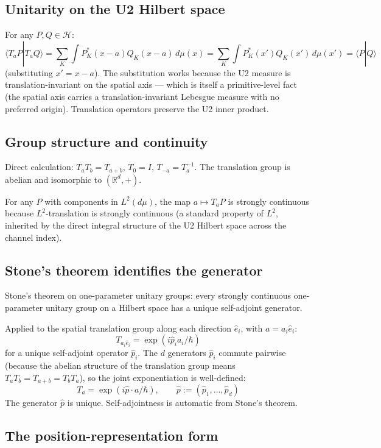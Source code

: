 \documentclass[11pt,a4paper]{article}
\begin{document}
\subsection{Unitarity on the U2 Hilbert space}

For any $P, Q \in \mathcal{H}$:
\[
\langle T_a P | T_a Q\rangle = \sum_K \int P^*_K(x - a) Q_K(x - a) \, d\mu(x) = \sum_K \int P^*_K(x') Q_K(x') \, d\mu(x') = \langle P | Q\rangle
\]
(substituting $x' = x - a$). The substitution works because the U2 measure is translation-invariant on the spatial axis --- which is itself a primitive-level fact (the spatial axis carries a translation-invariant Lebesgue measure with no preferred origin). Translation operators preserve the U2 inner product.

\subsection{Group structure and continuity}

Direct calculation: $T_a T_b = T_{a+b}$, $T_0 = I$, $T_{-a} = T_a^{-1}$. The translation group is abelian and isomorphic to $(\mathbb{R}^d, +)$.

For any $P$ with components in $L^2(d\mu)$, the map $a \mapsto T_a P$ is strongly continuous because $L^2$-translation is strongly continuous (a standard property of $L^2$, inherited by the direct integral structure of the U2 Hilbert space across the channel index).

\subsection{Stone's theorem identifies the generator}

Stone's theorem on one-parameter unitary groups: every strongly continuous one-parameter unitary group on a Hilbert space has a unique self-adjoint generator.

Applied to the spatial translation group along each direction $\hat{e}_i$, with $a = a_i \hat{e}_i$:
\[
T_{a_i \hat{e}_i} = \exp(i \hat{p}_i a_i / \hbar)
\]
for a unique self-adjoint operator $\hat{p}_i$. The $d$ generators $\hat{p}_i$ commute pairwise (because the abelian structure of the translation group means $T_a T_b = T_{a+b} = T_b T_a$), so the joint exponentiation is well-defined:
\[
T_a = \exp(i \hat{p} \cdot a / \hbar), \qquad \hat{p} := (\hat{p}_1, \ldots, \hat{p}_d)
\]
The generator $\hat{p}$ is unique. Self-adjointness is automatic from Stone's theorem.

\subsection{The position-representation form}
\end{document}

